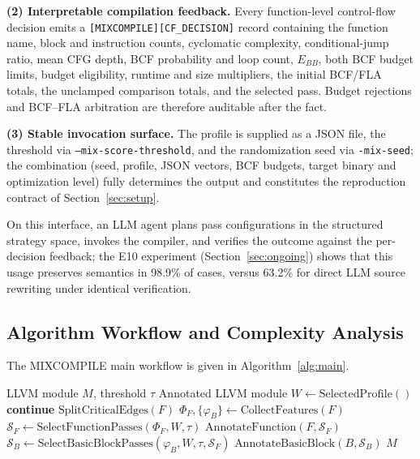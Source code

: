 \documentclass[pdflatex,sn-mathphys-num]{sn-jnl}
\theoremstyle{thmstyleone}%
\theoremstyle{thmstyletwo}%
\theoremstyle{thmstylethree}%
\begin{document}
\textbf{(2) Interpretable compilation feedback.} Every function-level control-flow
decision emits a \texttt{[MIXCOMPILE][CF\_DECISION]} record containing the function
name, block and instruction counts, cyclomatic complexity, conditional-jump ratio,
mean CFG depth, BCF probability and loop count, $E_{BB}$, both BCF budget limits,
budget eligibility, runtime and size multipliers, the initial BCF/FLA totals, the
unclamped comparison totals, and the selected pass. Budget rejections and BCF--FLA
arbitration are therefore auditable after the fact.

\textbf{(3) Stable invocation surface.} The profile is supplied as a JSON file, the
threshold via \texttt{--mix-score-threshold}, and the randomization seed via
\texttt{-mix-seed}; the combination (seed, profile, JSON vectors, BCF budgets, target
binary and optimization level) fully determines the output and constitutes the
reproduction contract of Section~\ref{sec:setup}.

On this interface, an LLM agent plans pass configurations in the structured
strategy space, invokes the compiler, and verifies the outcome against the
per-decision feedback; the E10 experiment (Section~\ref{sec:ongoing}) shows that
this usage preserves semantics in 98.9\% of cases, versus 63.2\% for direct LLM
source rewriting under identical verification.

\subsection{Algorithm Workflow and Complexity Analysis}

The MIXCOMPILE main workflow is given in Algorithm~\ref{alg:main}.

\begin{algorithm}[!t]
\footnotesize
\caption{MIXCOMPILE Main Workflow}
\label{alg:main}
\begin{algorithmic}[1]
    \Require LLVM module $M$, threshold $\tau$
    \Ensure Annotated LLVM module
    \State $W \gets \text{SelectedProfile}()$
         \State \textbf{continue} \EndIf
        \State $\text{SplitCriticalEdges}(F)$
        \State $\Phi_F, \{\varphi_B\} \gets \text{CollectFeatures}(F)$
        \State $\mathcal{S}_F \gets \text{SelectFunctionPasses}(\Phi_F, W, \tau)$
        \State $\text{AnnotateFunction}(F, \mathcal{S}_F)$
            \State $\mathcal{S}_B \gets \text{SelectBasicBlockPasses}(\varphi_B, W, \tau, \mathcal{S}_F)$
            \State $\text{AnnotateBasicBlock}(B, \mathcal{S}_B)$
        \EndFor
    \EndFor
    \Return $M$
\end{algorithmic}
\end{algorithm}
\end{document}
